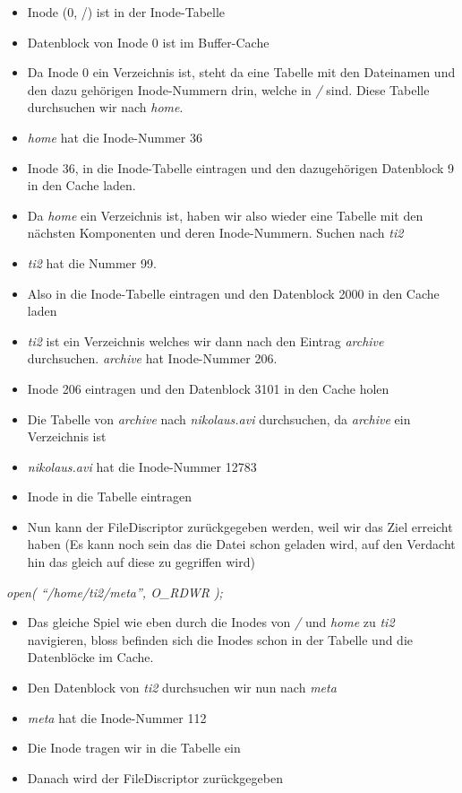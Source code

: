\documentclass{ti2}
\begin{document}
\begin{itemize}
	\item Inode (0, /) ist in der Inode-Tabelle
	\item Datenblock von Inode 0 ist im Buffer-Cache
	\item Da Inode 0 ein Verzeichnis ist, steht da eine Tabelle mit den
	Dateinamen und den dazu gehörigen Inode-Nummern drin, welche in
	\emph{/} sind. Diese Tabelle durchsuchen wir nach \emph{home}.
	\item \emph{home} hat die Inode-Nummer 36
	\item Inode 36, in die Inode-Tabelle eintragen und den dazugehörigen
	Datenblock 9 in den Cache laden.
	\item Da \emph{home} ein Verzeichnis ist, haben wir also wieder eine Tabelle
	mit den nächsten Komponenten und deren Inode-Nummern. Suchen nach
	\emph{ti2}
	\item \emph{ti2} hat die Nummer 99.
	\item Also in die Inode-Tabelle eintragen und den Datenblock 2000 in den
	Cache laden
	\item \emph{ti2} ist ein Verzeichnis welches wir dann nach den Eintrag
	\emph{archive} durchsuchen. \emph{archive} hat Inode-Nummer 206.
	\item Inode 206 eintragen und den Datenblock 3101 in den Cache holen
	\item Die Tabelle von \emph{archive} nach \emph{nikolaus.avi} durchsuchen,
	da \emph{archive} ein Verzeichnis ist
	\item \emph{nikolaus.avi} hat die Inode-Nummer 12783
	\item Inode in die Tabelle eintragen
	\item Nun kann der FileDiscriptor zurückgegeben werden, weil wir das Ziel
	erreicht haben
	(Es kann noch sein das die Datei schon geladen wird, auf den Verdacht hin das gleich auf diese zu gegriffen wird)
\end{itemize}

\emph{open( ``/home/ti2/meta'', O\_RDWR );}

\begin{itemize}
	\item Das gleiche Spiel wie eben durch die Inodes von \emph{/} und
	\emph{home} zu \emph{ti2} navigieren, bloss befinden sich die Inodes
	schon in der Tabelle und die Datenblöcke im Cache.
	\item Den Datenblock von \emph{ti2} durchsuchen wir nun nach \emph{meta}
	\item \emph{meta} hat die Inode-Nummer 112
	\item Die Inode tragen wir in die Tabelle ein
	\item Danach wird der FileDiscriptor zurückgegeben
\end{itemize}
\end{document}
